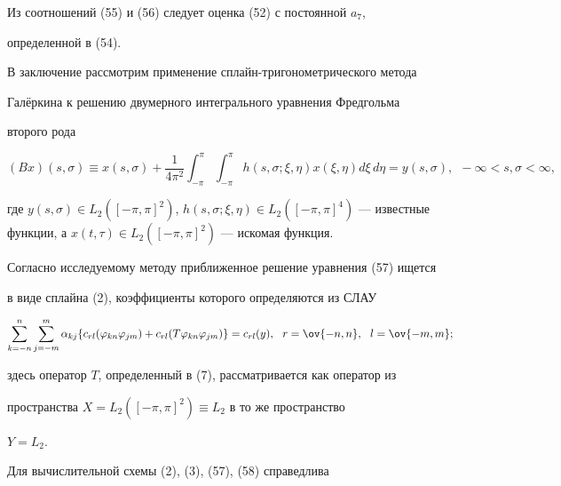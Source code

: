 Из соотношений (55) и (56) следует оценка (52) с постоянной $a_7$, 


определенной в (54). 


 


В заключение рассмотрим применение сплайн-тригонометрического метода 


Гал\"еркина к решению двумерного интегрального уравнения Фредгольма 


второго рода 


\begin{equation} 


(B x)(s,\sigma)\equiv x(s,\sigma)+\frac{1}{4\pi^2} 


\int^\pi_{-\pi}\int^\pi_{-\pi}h(s,\sigma;\xi,\eta) 


x(\xi,\eta)d\xi\,d\eta=y(s,\sigma), 


\ \ -\infty<s,\sigma<\infty, 


\end{equation} 


где $y(s,\sigma)\in L_2([-\pi,\pi]^2)$, $h(s,\sigma;\xi,\eta)\in 


L_2([-\pi,\pi]^4)$ --- известные функции, а $x(t,\tau)\in 


L_2([-\pi,\pi]^2)$ --- искомая функция. 


 


Согласно исследуемому методу приближенное решение уравнения (57) ищется 


в виде сплайна (2), коэффициенты которого определяются из СЛАУ 


\begin{equation} 


\sum^n_{k=-n}\sum^m_{j=-m}\alpha_{k j} 


\{c_{r l}(\varphi_{k n}\varphi_{j m})+ 


c_{r l}(T\varphi_{k n}\varphi_{j m})\}=c_{r l}(y), 


\ \ r=\ov{-n,n},\ \ l=\ov{-m,m}; 


\end{equation} 


здесь оператор $T$, определенный в (7), рассматривается как оператор из 


пространства $X=L_2([-\pi,\pi]^2)\equiv L_2$ в то же пространство 


$Y=L_2$. 


 


Для вычислительной схемы (2), (3), (57), (58) справедлива 


